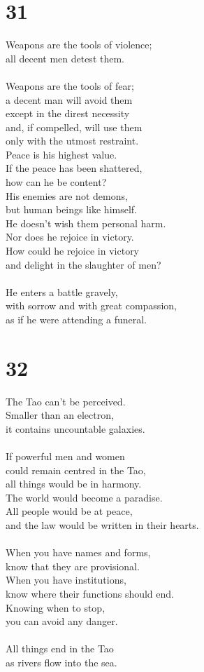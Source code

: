 \documentclass[b5paper, 12pt, oneside]{book}
\begin{document}
\chapter*{31}
Weapons are the tools of violence;\\
all decent men detest them.\\
\\
Weapons are the tools of fear;\\
a decent man will avoid them\\
except in the direst necessity\\
and, if compelled, will use them\\
only with the utmost restraint.\\
Peace is his highest value.\\
If the peace has been shattered,\\
how can he be content?\\
His enemies are not demons,\\
but human beings like himself.\\
He doesn't wish them personal harm.\\
Nor does he rejoice in victory.\\
How could he rejoice in victory\\
and delight in the slaughter of men?\\
\\
He enters a battle gravely,\\
with sorrow and with great compassion,\\
as if he were attending a funeral.\\

\chapter*{32}
The Tao can't be perceived.\\
Smaller than an electron,\\
it contains uncountable galaxies.\\
\\
If powerful men and women\\
could remain centred in the Tao,\\
all things would be in harmony.\\
The world would become a paradise.\\
All people would be at peace,\\
and the law would be written in their hearts.\\
\\
When you have names and forms,\\
know that they are provisional.\\
When you have institutions,\\
know where their functions should end.\\
Knowing when to stop,\\
you can avoid any danger.\\
\\
All things end in the Tao\\
as rivers flow into the sea.\\
\end{document}
